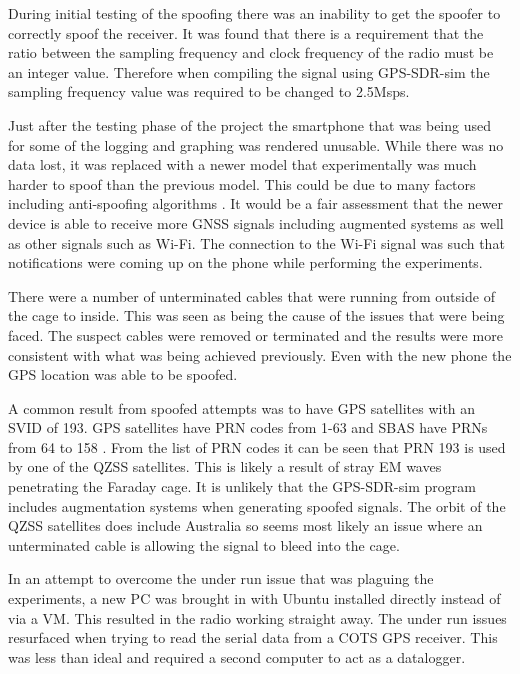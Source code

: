 During initial testing of the spoofing there was an inability to get the spoofer to correctly spoof the receiver. It was found that there is a requirement that the ratio
between the sampling frequency and clock frequency of the radio must be an integer value. Therefore when compiling the signal using GPS-SDR-sim the sampling frequency
value was required to be changed to 2.5Msps.  

Just after the testing phase of the project the smartphone that was being used for some of the logging and graphing was rendered unusable. While there was no data lost,
it was replaced with a newer model that experimentally was much harder to spoof than the previous model. This could be due to many factors including anti-spoofing
algorithms \cite{RN39}. It would be a fair assessment that the newer device is able to receive more GNSS signals including augmented systems as well as other signals such as Wi-Fi.
The connection to the Wi-Fi signal was such that notifications were coming up on the phone while performing the experiments.

There were a number of unterminated cables that were running from outside of the cage to inside. This was seen as being the cause of the issues that were being faced. The
suspect cables were removed or terminated and the results were more consistent with what was being achieved previously. Even with the new phone the GPS location was able
to be spoofed.

A common result from spoofed attempts was to have GPS satellites with an SVID of 193. GPS satellites have PRN codes from 1-63 and SBAS have PRNs from
64 to 158 \cite{RN67}. From the list of PRN codes \cite{RN67} it can be seen that PRN 193 is used by one of the QZSS satellites. This is likely a result of stray EM waves
penetrating the Faraday cage. It is unlikely that the GPS-SDR-sim program includes augmentation systems when generating spoofed signals. The orbit of the QZSS satellites
does include Australia so seems most likely an issue where an unterminated cable is allowing the signal to bleed into the cage.

In an attempt to overcome the under run issue that was plaguing the experiments, a new PC was brought in with Ubuntu installed directly instead of via a VM. This resulted
in the radio working straight away. The under run issues resurfaced when trying to read the serial data from a COTS GPS receiver. This was less than ideal and required a
second computer to act as a datalogger.

